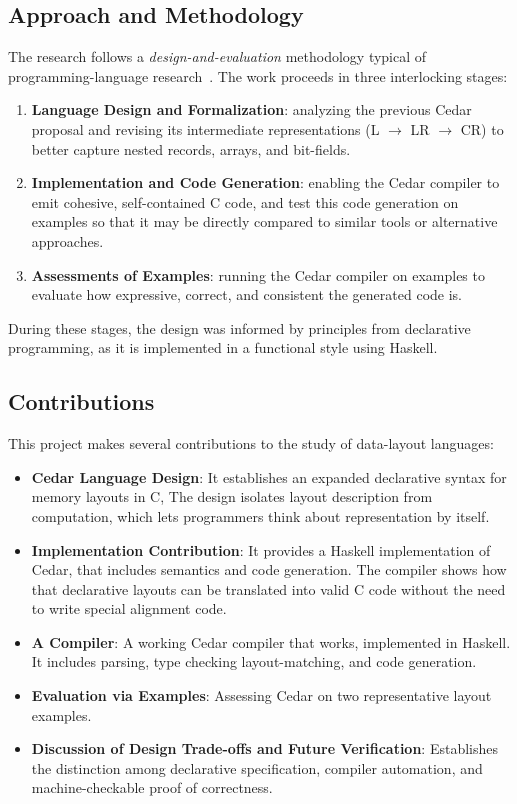 \subsection {Approach and Methodology}
The research follows a \textit{design-and-evaluation} methodology typical
of programming-language research~\autocite{incremental_development}.
The work proceeds in three interlocking stages:
\begin{enumerate}
    \item \textbf{Language Design and Formalization}: analyzing the previous
    Cedar proposal and revising its intermediate representations
    (L $\rightarrow$ LR $\rightarrow$ CR) to better capture nested records, arrays,
    and bit-fields.
    \item \textbf{Implementation and Code Generation}: enabling the Cedar
    compiler to emit cohesive, self-contained C code, and test
    this code generation on examples so that it may be directly
    compared to similar tools or alternative approaches.
    \item \textbf{Assessments of Examples}: running the Cedar compiler on
    examples to evaluate how expressive, correct, and consistent the
    generated code is.
\end{enumerate}

During these stages, the design was informed by principles from declarative
programming, as it is implemented in a functional style using Haskell.
    
\subsection{Contributions}
This project makes several contributions to the study of data-layout
languages:
\begin{itemize}
    \item \textbf{Cedar Language Design}: It establishes an expanded declarative syntax for memory layouts in C,
    The design isolates layout description
    from computation, which lets programmers think about representation by itself.
    \item \textbf{Implementation Contribution}: 
    It provides a Haskell implementation of Cedar, that includes semantics and
    code generation. The compiler shows how that
    declarative layouts can be translated into valid C code without the
    need to write special alignment code.
    \item \textbf{A Compiler}: A working Cedar compiler that works,
    implemented in Haskell. It includes parsing, type checking layout-matching,
    and code generation.
    \item \textbf{Evaluation via Examples}: 
    Assessing Cedar on two representative layout examples.
    \item \textbf{Discussion of Design Trade-offs and Future Verification}:
    Establishes the distinction among declarative specification,
    compiler automation, and machine-checkable proof of correctness.
\end{itemize}


